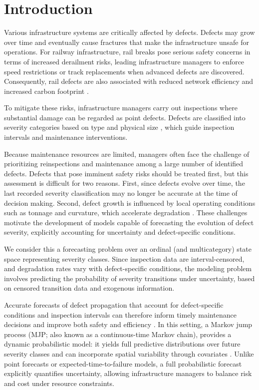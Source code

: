 \documentclass{article}
\begin{document}
\section{Introduction} \label{sec:introduction} %
Various infrastructure systems are critically affected by defects. Defects may grow over time and eventually cause fractures that make the infrastructure unsafe for operations.
For railway infrastructure, rail breaks pose serious safety concerns in terms of increased derailment risks, leading infrastructure managers to enforce speed restrictions or track replacements when advanced defects are discovered. 
Consequently, rail defects are also associated with reduced network efficiency and increased carbon footprint \citep{cannon2003a,Zoeteman2014DutchBeyond}.  

To mitigate these risks, infrastructure managers carry out inspections where substantial damage can be regarded as point defects. 
Defects are classified into severity categories based on type and physical size \citep{UIC_2002_defecthandbook}, which guide inspection intervals and maintenance interventions.  

Because maintenance resources are limited, managers often face the challenge of prioritizing reinspections and maintenance among a large number of identified defects.
Defects that pose imminent safety risks should be treated first, but this assessment is difficult for two reasons. 
First, since defects evolve over time, the last recorded severity classification may no longer be accurate at the time of decision making.
Second, defect growth is influenced by local operating conditions such as tonnage and curvature, which accelerate degradation \citep{bai2017a,Kumar2008HolisticSweden}.
These challenges motivate the development of models capable of forecasting the evolution of defect severity, explicitly accounting for uncertainty and defect-specific conditions.

We consider this a forecasting problem over an ordinal (and multicategory) state space representing severity classes. Since inspection data are interval-censored, and degradation rates vary with defect-specific conditions, the modeling problem involves predicting the probability of severity transitions under uncertainty, based on censored transition data and exogenous information.

Accurate forecasts of defect propagation that account for defect-specific conditions and inspection intervals can therefore inform timely maintenance decisions and improve both safety and efficiency \citep{Binder2023}. In this setting, a Markov jump process (MJP; also known as a continuous-time Markov chain), provides a dynamic probabilistic model: it yields full predictive distributions over future severity classes and can incorporate spatial variability through covariates \citep{bisgaard2024A}. Unlike point forecasts or expected-time-to-failure models, a full probabilistic forecast explicitly quantifies uncertainty, allowing infrastructure managers to balance risk and cost under resource constraints.
\end{document}
